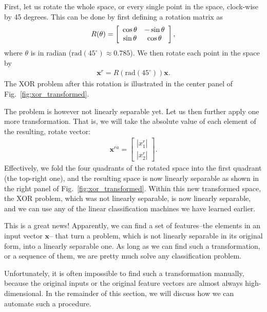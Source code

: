 \documentclass{report}
\newcommand{\vect}[1]{\mathbf{#1}}
\newcommand{\vx}[0]{\vect{x}}
\begin{document}
First, let us rotate the whole space, or every single point in the space,
clock-wise by 45 degrees. This can be done by first defining a rotation matrix
as
\begin{align*}
    R(\theta) = \left[
        \begin{array}{c c}
            \cos \theta & -\sin \theta \\
            \sin \theta & \cos \theta
        \end{array}
    \right],
\end{align*}
where $\theta$ is in radian ($\text{rad}(45^\circ) \approx 0.785$). We then
rotate each point in the space by
\begin{align*}
    \vx^r = R(\text{rad}(45^\circ)) \vx.
\end{align*}
The XOR problem after this rotation is illustrated in the center panel of
Fig.~\ref{fig:xor_transformed}. 

The problem is however not linearly separable yet. Let us then further apply one
more transformation. That is, we will take the absolute value of each element of
the resulting, rotate vector:
\begin{align*}
    \vx^{ra} = \left[ 
        \begin{array}{c}
            |x^r_1| \\
            |x^r_2|
        \end{array}
    \right].
\end{align*}
Effectively, we fold the four quadrants of the rotated space into the first
quadrant (the top-right one), and the resulting space is now linearly separable
as shown in the right panel of Fig.~\ref{fig:xor_transformed}.  Within this new
transformed space, the XOR problem, which was not linearly separable, is now
linearly separable, and we can use any of the linear classification machines we
have learned earlier. 

This is a great news! Apparently, we can find a set of features--the elements in
an input vector $\vx$-- that turn a problem, which is not linearly separable in
its original form, into a linearly separable one. As long as we can find such a
transformation, or a sequence of them, we are pretty much solve any
classification problem.  

Unfortunately, it is  often impossible to find such a transformation manually,
because the original inputs or the original feature vectors are almost always
high-dimensional. In the remainder of this section, we will discuss how we can
automate such a procedure. 
\end{document}
